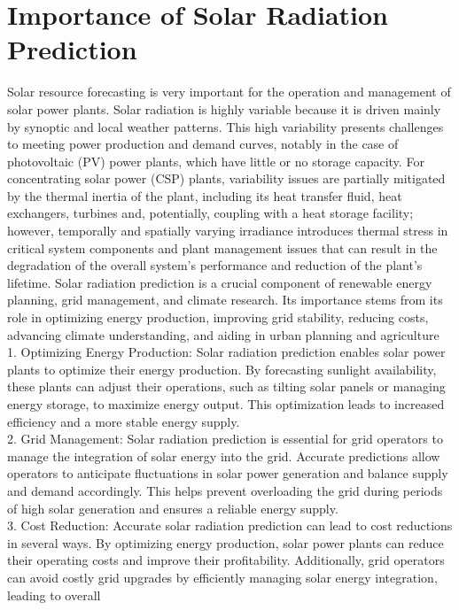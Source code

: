 \documentclass[12pt,a4paper]{report}
\begin{document}
\chapter{Importance of Solar Radiation Prediction}
Solar resource forecasting is very important for the operation and management of solar 
power plants. Solar radiation is highly variable because it is driven mainly by synoptic 
and local weather patterns. This high variability presents challenges to meeting power 
production and demand curves, notably in the case of photovoltaic (PV) power plants, 
which have little or no storage capacity. For concentrating solar power (CSP) plants, 
variability issues are partially mitigated by the thermal inertia of the plant, including its 
heat transfer fluid, heat exchangers, turbines and, potentially, coupling with a heat 
storage facility; however, temporally and spatially varying irradiance introduces thermal 
stress in critical system components and plant management issues that can result in the 
degradation of the overall system’s performance and reduction of the plant’s lifetime. 
Solar radiation prediction is a crucial component of renewable energy planning, grid 
management, and climate research. Its importance stems from its role in optimizing 
energy production, improving grid stability, reducing costs, advancing climate 
understanding, and aiding in urban planning and agriculture\\
1. Optimizing Energy Production: Solar radiation prediction enables solar power 
plants to optimize their energy production. By forecasting sunlight availability, these 
plants can adjust their operations, such as tilting solar panels or managing energy 
storage, to maximize energy output. This optimization leads to increased efficiency and 
a more stable energy supply.\\
2. Grid Management: Solar radiation prediction is essential for grid operators to 
manage the integration of solar energy into the grid. Accurate predictions allow 
operators to anticipate fluctuations in solar power generation and balance supply and 
demand accordingly. This helps prevent overloading the grid during periods of high 
solar generation and ensures a reliable energy supply.\\
3. Cost Reduction: Accurate solar radiation prediction can lead to cost reductions in 
several ways. By optimizing energy production, solar power plants can reduce their 
operating costs and improve their profitability. Additionally, grid operators can avoid 
costly grid upgrades by efficiently managing solar energy integration, leading to overall 
\end{document}
